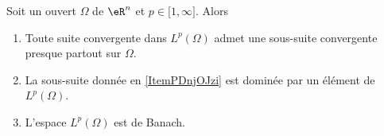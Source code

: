 \begin{theorem} \label{ThoGVmqOro}
    Soit un ouvert \( \Omega\) de \( \eR^n\) et \( p\in\mathopen[ 1 , \infty \mathclose]\). Alors
    \begin{enumerate}
        \item\label{ItemPDnjOJzi}
            Toute suite convergente dans \( L^p(\Omega)\) admet une sous-suite convergente presque partout sur \( \Omega\).
        \item\label{ItemPDnjOJzii}
            La sous-suite donnée en \ref{ItemPDnjOJzi} est dominée par un élément de \( L^p(\Omega)\).
        \item\label{ItemPDnjOJziii}
            L'espace \( L^p(\Omega)\) est de Banach.
    \end{enumerate}
\end{theorem}

